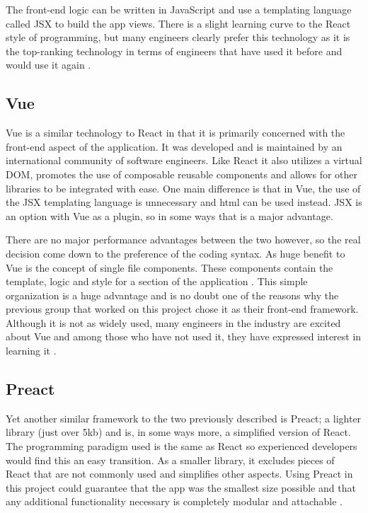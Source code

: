     The front-end logic can be written in JavaScript and use a templating language called JSX to build the app views. There is a slight learning curve to the React style of programming, but many engineers clearly prefer this technology as it is the top-ranking technology in terms of engineers that have used it before and would use it again \cite{stateofjs2017}.

    \subsection{Vue}
    Vue is a similar technology to React in that it is primarily concerned with the front-end aspect of the application. It was developed and is maintained by an international community of software engineers. Like React it also utilizes a virtual DOM, promotes the use of composable reusable components and allows for other libraries to be integrated with ease. One main difference is that in Vue, the use of the JSX templating language is unnecessary and html can be used instead. JSX is an option with Vue as a plugin, so in some ways that is a major advantage. 
    
    There are no major performance advantages between the two however, so the real decision come down to the preference of the coding syntax. As huge benefit to Vue is the concept of single file components. These components contain the template, logic and style for a section of the application \cite{vue}. This simple organization is a huge advantage and is no doubt one of the reasons why the previous group that worked on this project chose it as their front-end framework. Although it is not as widely used, many engineers in the industry are excited about Vue and among those who have not used it, they have expressed interest in learning it \cite{stateofjs2017}.

    \subsection{Preact}
    Yet another similar framework to the two previously described is Preact; a lighter library (just over 5kb) and is, in some ways more, a simplified version of React. The programming paradigm used is the same as React so experienced developers would find this an easy transition. As a smaller library, it excludes pieces of React that are not commonly used and simplifies other aspects. Using Preact in this project could guarantee that the app was the smallest size possible and that any additional functionality necessary is completely modular and attachable \cite{preact}.
    
